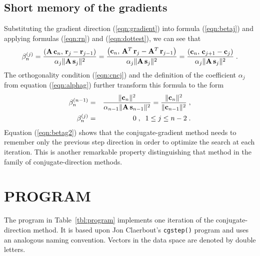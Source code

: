 \subsection{Short memory of the gradients}
Substituting the gradient direction (\ref{eqn:gradient}) into formula
(\ref{eqn:betaj}) and applying formulas (\ref{eqn:rn}) and (\ref{eqn:dottest}), we can
see that
\begin{equation}
\beta_n^{(j)} = 
{{\left({\bf A\,c}_n,\,{\bf r}_{j} - {\bf r}_{j-1}\right)} \over
{\alpha_j\|{\bf A\,s}_{j}\|^2}} =
{{\left({\bf c}_n,\,{\bf A}^T\,{\bf r}_{j} - 
{\bf A}^T\,{\bf r}_{j-1}\right)} \over
{\alpha_j\|{\bf A\,s}_{j}\|^2}} =
{{\left({\bf c}_n,\,{\bf c}_{j+1} - {\bf c}_{j}\right)} \over
{\alpha_j\|{\bf A\,s}_{j}\|^2}}\;.
\label{eqn:betag}
\end{equation} 
The orthogonality condition (\ref{eqn:cncj}) and the definition of the
coefficient $\alpha_j$ from equation (\ref{eqn:alphag}) further transform this formula 
to the form
\begin{eqnarray}
\beta_n^{(n-1)} & = &
{{\|{\bf c}_n\|^2} \over
{\alpha_{n-1}\|{\bf A\,s}_{n-1}\|^2}} =
{{\|{\bf c}_n\|^2} \over
{\|{\bf c}_{n-1}\|^2}}\;,
\label{eqn:betag1} \\
\beta_n^{(j)}  & = & 0\;,\;\;1 \leq j \leq n-2\;.
\label{eqn:betag2}
\end{eqnarray}
Equation (\ref{eqn:betag2}) shows that the conjugate-gradient method needs
to remember only the previous step direction in order to optimize the
search at each iteration. This is another remarkable property
distinguishing that method in the family of conjugate-direction
methods.

\section{PROGRAM}
The program in Table~\ref{tbl:program} implements one
iteration of the conjugate-direction method. It is based upon Jon
Claerbout's \verb!cgstep()! program \cite[]{gee} and uses an analogous
naming convention. Vectors in the data space are denoted by double
letters.




